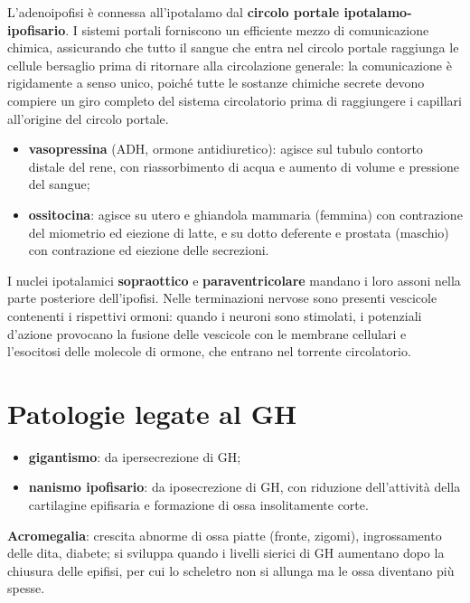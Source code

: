 L'adenoipofisi è connessa all'ipotalamo dal \textbf{circolo portale
ipotalamo-ipofisario}. I sistemi portali forniscono un efficiente mezzo di
comunicazione chimica, assicurando che tutto il sangue che entra nel circolo
portale raggiunga le cellule bersaglio prima di ritornare alla circolazione
generale: la comunicazione è rigidamente a senso unico, poiché tutte le
sostanze chimiche secrete devono compiere un giro completo del sistema
circolatorio prima di raggiungere i capillari all'origine del circolo
portale.

\begin{itemize}
  \item \textbf{vasopressina} (ADH, ormone antidiuretico): agisce sul
    tubulo contorto distale del rene, con riassorbimento di acqua e aumento
    di volume e pressione del sangue;
  \item \textbf{ossitocina}: agisce su utero e ghiandola mammaria (femmina)
    con contrazione del miometrio ed eiezione di latte, e su dotto
    deferente e prostata (maschio) con contrazione ed eiezione delle
    secrezioni.
\end{itemize}

I nuclei ipotalamici \textbf{sopraottico} e \textbf{paraventricolare}
mandano i loro assoni nella parte posteriore dell'ipofisi. Nelle
terminazioni nervose sono presenti vescicole contenenti i rispettivi
ormoni: quando i neuroni sono stimolati, i potenziali d'azione provocano la
fusione delle vescicole con le membrane cellulari e l'esocitosi delle
molecole di ormone, che entrano nel torrente circolatorio.

\section{Patologie legate al GH}

\begin{itemize}
  \item \textbf{gigantismo}: da ipersecrezione di GH;
  \item \textbf{nanismo ipofisario}: da iposecrezione di GH, con riduzione
    dell'attività della cartilagine epifisaria e formazione di ossa
    insolitamente corte.
\end{itemize}

\textbf{Acromegalia}: crescita abnorme di ossa piatte (fronte, zigomi),
ingrossamento delle dita, diabete; si sviluppa quando i livelli sierici di
GH aumentano dopo la chiusura delle epifisi, per cui lo scheletro non si
allunga ma le ossa diventano più spesse.

